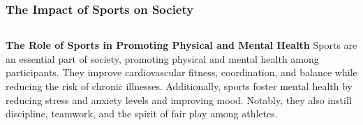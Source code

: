 \documentclass[5pt]{beamer}
\begin{document}
\begin{frame}
\frametitle{The Impact of Sports on Society}
\begin{columns}
\begin{column}{0.7\textwidth}
\begin{block}{\textbf{The Role of Sports in Promoting Physical and Mental Health}}
Sports are an essential part of society, promoting physical and mental health among participants. They improve cardiovascular fitness, coordination, and balance while reducing the risk of chronic illnesses. Additionally, sports foster mental health by reducing stress and anxiety levels and improving mood. Notably, they also instill discipline, teamwork, and the spirit of fair play among athletes.
\end{block}
\end{column}
\end{columns}
\end{frame}
\end{document}

